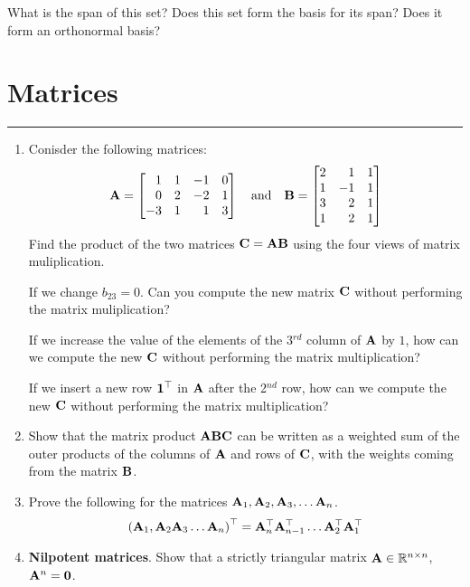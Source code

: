\documentclass[
11pt, %
a4paper, %
oneside, %
headinclude,footinclude, %
BCOR5mm, %
]{scrartcl}
\def\mf{\ensuremath\mathbf}
\def\mb{\ensuremath\mathbb}
\def\lp{\ensuremath\left(}
\def\rp{\ensuremath\right)}
\def\bmx{\ensuremath\begin{bmatrix*}[r]}
\def\emx{\ensuremath\end{bmatrix*}}
\begin{document}
\begin{enumerate}
What is the span of this set? Does this set form the basis for its span? Does it form an orthonormal basis?

\end{enumerate}

\newpage

\section{Matrices}
\hrule
\vspace{0.5cm}

\begin{enumerate}
	\item Conisder the following matrices:
	\[ \mf{A} = \bmx 1 & 1 & -1 & 0 \\
	0 & 2 & -2 & 1 \\
	-3 & 1 & 1 & 3
	\emx \quad \text{and} \quad \mf{B} = \bmx 2 & 1 & 1 \\
	1 & -1 & 1 \\
	3 & 2 & 1 \\
	1 & 2 & 1
	\emx \]
	Find the product of the two matrices $\mf{C} = \mf{A}\mf{B}$ using the four views of matrix muliplication.

	If we change $b_{23} = 0$. Can you compute the new matrix $\mf{C}$ without performing the matrix muliplication?

	If we increase the value of the elements of the 3$^{rd}$ column of $\mf{A}$ by $1$, how can we compute the new $\mf{C}$ without performing the matrix multiplication?

	If we insert a new row $\mf{1}^\top$ in $\mf{A}$ after the 2$^{nd}$ row, how can we compute the new $\mf{C}$ without performing the matrix multiplication? 

	\item Show that the matrix product $\mf{A}\mf{B}\mf{C}$ can be written as a weighted sum  of the outer products of the columns of $\mf{A}$ and rows of $\mf{C}$, with the weights coming from the matrix $\mf{B}$.

	\item Prove the following for the matrices $\mf{A}_1, \mf{A}_2, \mf{A}_3, \ldots \mf{A}_n$.
	\[ \lp \mf{A}_1, \mf{A}_2 \mf{A}_3 \ldots \mf{A}_n \rp^\top =  \mf{A}_n^\top \mf{A}_{n-1}^\top \ldots \mf{A}_2^\top \mf{A}_1^\top \]


	\item \textbf{Nilpotent matrices}. Show that a strictly triangular matrix $\mf{A} \in \mb{R}^{n \times n}$, $\mf{A}^n = \mf{0}$.


\end{enumerate}
\end{document}
